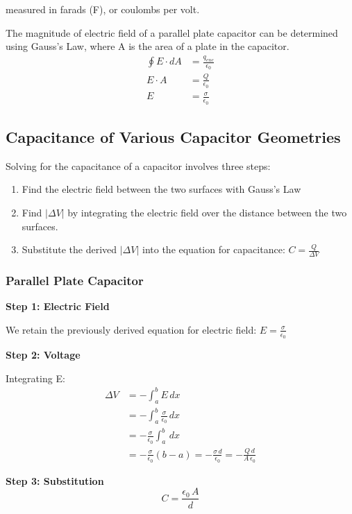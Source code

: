 \documentclass[12pt, titlepage]{article}
\begin{document}
measured in farads (F), or coulombs per volt.

The magnitude of electric field of a parallel plate capacitor can be determined using Gauss's Law, where A is the area of a plate in the capacitor. 
\begin{align*}
    \oint E \cdot dA &= \frac{q_{enc}}{\epsilon_0} \\
    E \cdot A &= \frac{Q}{\epsilon_0} \\
    E &= \frac{\sigma}{\epsilon_0}
\end{align*}

\subsection*{Capacitance of Various Capacitor Geometries}

Solving for the capacitance of a capacitor involves three steps:

\begin{enumerate}
    \item Find the electric field between the two surfaces with Gauss's Law
    \item Find $|\Delta V|$ by integrating the electric field over the distance between the two surfaces.
    \item Substitute the derived $|\Delta V|$ into the equation for capacitance: $C = \frac{Q}{\Delta V}$
\end{enumerate}

\subsubsection*{Parallel Plate Capacitor}

\textbf{Step 1: Electric Field}

We retain the previously derived equation for electric field: $E = \frac{\sigma}{\epsilon_0}$

\textbf{Step 2: Voltage}

Integrating E:
\begin{align*}
    \Delta V & = - \int_{a}^{b}E \, dx \\
    &= - \int_{a}^{b} \frac{\sigma}{\epsilon_0} \, dx\\
    &= -\frac{\sigma}{\epsilon_0} \int_{a}^{b} \, dx\\
    &= -\frac{\sigma}{\epsilon_0} (b-a)
    = -\frac{\sigma \, d}{\epsilon_0}
    = -\frac{Q \, d}{A \, \epsilon_0}
\end{align*}

\textbf{Step 3: Substitution}
\begin{equation*}
    C = \frac{\epsilon_0 \, A}{d}
\end{equation*}
\end{document}
